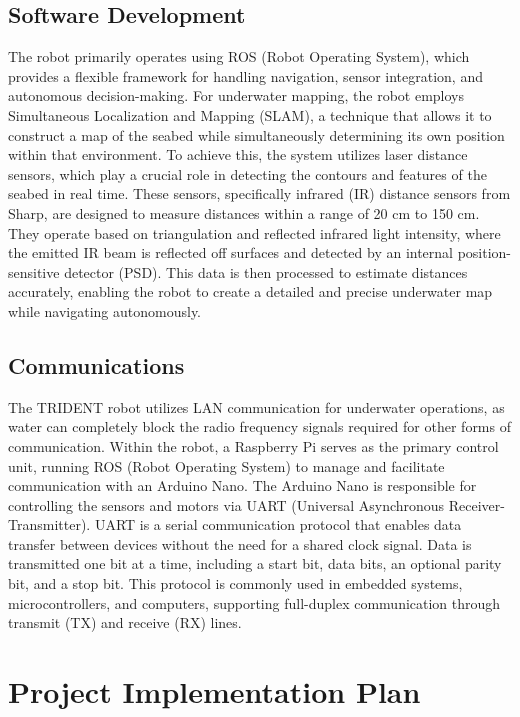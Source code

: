 \subsection{Software Development}

The robot primarily operates using ROS (Robot Operating System), which 
provides a flexible framework for handling navigation, sensor integration, 
and autonomous decision-making. For underwater mapping, the robot employs 
Simultaneous Localization and Mapping (SLAM), a technique that allows it 
to construct a map of the seabed while simultaneously determining its own 
position within that environment. To achieve this, the system utilizes 
laser distance sensors, which play a crucial role in detecting the 
contours and features of the seabed in real time. These sensors, 
specifically infrared (IR) distance sensors from Sharp, are designed to 
measure distances within a range of 20 cm to 150 cm. They operate based 
on triangulation and reflected infrared light intensity, where the 
emitted IR beam is reflected off surfaces and detected by an internal 
position-sensitive detector (PSD). This data is then processed to 
estimate distances accurately, enabling the robot to create a detailed 
and precise underwater map while navigating autonomously.

\subsection{Communications}

The TRIDENT robot utilizes LAN communication for underwater operations, 
as water can completely block the radio frequency signals required for 
other forms of communication. Within the robot, a Raspberry Pi serves as 
the primary control unit, running ROS (Robot Operating System) to manage 
and facilitate communication with an Arduino Nano. The Arduino Nano is 
responsible for controlling the sensors and motors via UART (Universal 
Asynchronous Receiver-Transmitter). UART is a serial communication 
protocol that enables data transfer between devices without the need for 
a shared clock signal. Data is transmitted one bit at a time, including 
a start bit, data bits, an optional parity bit, and a stop bit. This 
protocol is commonly used in embedded systems, microcontrollers, and 
computers, supporting full-duplex communication through transmit (TX) 
and receive (RX) lines.

\section{Project Implementation Plan}

